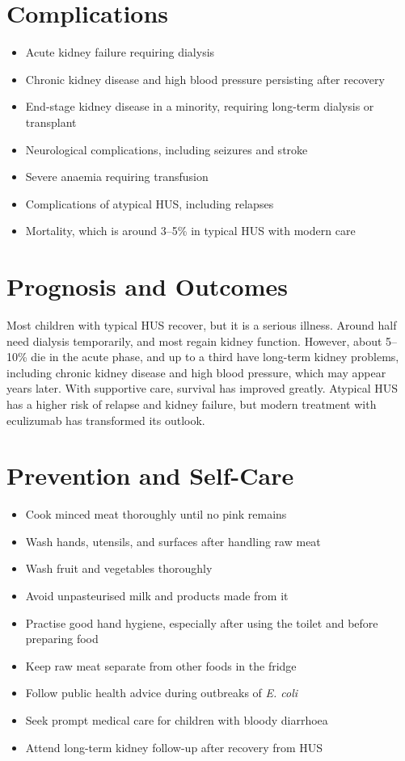 \section*{Complications}
\begin{itemize}
    \item Acute kidney failure requiring dialysis
    \item Chronic kidney disease and high blood pressure persisting after recovery
    \item End-stage kidney disease in a minority, requiring long-term dialysis or transplant
    \item Neurological complications, including seizures and stroke
    \item Severe anaemia requiring transfusion
    \item Complications of atypical HUS, including relapses
    \item Mortality, which is around 3--5\% in typical HUS with modern care
\end{itemize}

\section*{Prognosis and Outcomes}
Most children with typical HUS recover, but it is a serious illness. Around half need dialysis temporarily, and most regain kidney function. However, about 5--10\% die in the acute phase, and up to a third have long-term kidney problems, including chronic kidney disease and high blood pressure, which may appear years later. With supportive care, survival has improved greatly. Atypical HUS has a higher risk of relapse and kidney failure, but modern treatment with eculizumab has transformed its outlook.

\section*{Prevention and Self-Care}
\begin{itemize}
    \item Cook minced meat thoroughly until no pink remains
    \item Wash hands, utensils, and surfaces after handling raw meat
    \item Wash fruit and vegetables thoroughly
    \item Avoid unpasteurised milk and products made from it
    \item Practise good hand hygiene, especially after using the toilet and before preparing food
    \item Keep raw meat separate from other foods in the fridge
    \item Follow public health advice during outbreaks of \textit{E. coli}
    \item Seek prompt medical care for children with bloody diarrhoea
    \item Attend long-term kidney follow-up after recovery from HUS
\end{itemize}

